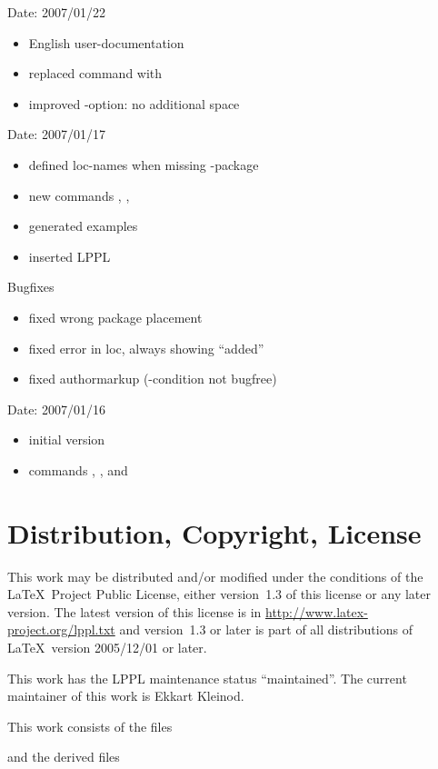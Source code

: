 
Date: 2007/01/22
\begin{itemize}
	\item English user-documentation
	\item replaced command  with 
	\item improved -option: no additional space
\end{itemize}


Date: 2007/01/17
\begin{itemize}
	\item defined loc-names when missing -package
	\item new commands , , 
	\item generated examples
	\item inserted LPPL
\end{itemize}
Bugfixes
\begin{itemize}
	\item fixed wrong  package placement
	\item fixed error in loc, always showing ``added''
	\item fixed authormarkup (-condition not bugfree)
\end{itemize}


Date: 2007/01/16
\begin{itemize}
	\item initial version
	\item commands , , and 
\end{itemize}


\section{Distribution, Copyright, License}



This work may be distributed and/or modified under the conditions of the \LaTeX\ Project Public License, either version~1.3 of this license or any later version.
The latest version of this license is in \url{http://www.latex-project.org/lppl.txt} and version~1.3 or later is part of all distributions of \LaTeX\ version 2005/12/01 or later.

This work has the LPPL maintenance status ``maintained''.
The current maintainer of this work is Ekkart Kleinod.

This work consists of the files



and the derived files




